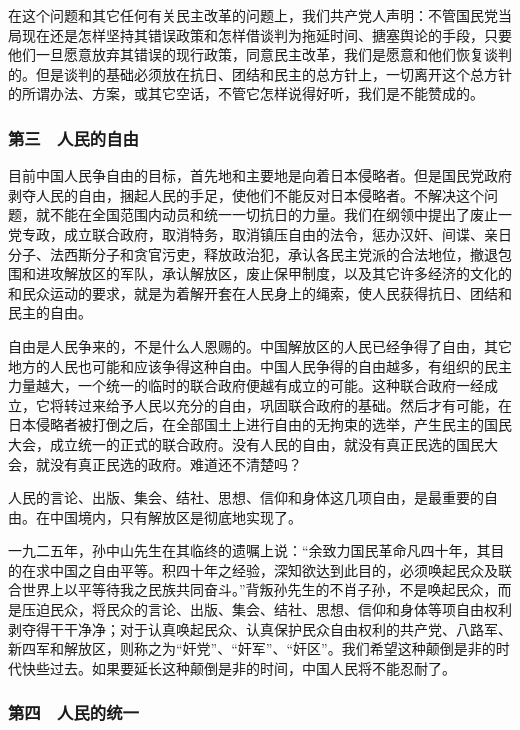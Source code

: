 在这个问题和其它任何有关民主改革的问题上，我们共产党人声明：不管国民党当局现在还是怎样坚持其错误政策和怎样借谈判为拖延时间、搪塞舆论的手段，只要他们一旦愿意放弃其错误的现行政策，同意民主改革，我们是愿意和他们恢复谈判的。但是谈判的基础必须放在抗日、团结和民主的总方针上，一切离开这个总方针的所谓办法、方案，或其它空话，不管它怎样说得好听，我们是不能赞成的。

\subsubsection{第三　人民的自由}

目前中国人民争自由的目标，首先地和主要地是向着日本侵略者。但是国民党政府剥夺人民的自由，捆起人民的手足，使他们不能反对日本侵略者。不解决这个问题，就不能在全国范围内动员和统一一切抗日的力量。我们在纲领中提出了废止一党专政，成立联合政府，取消特务，取消镇压自由的法令，惩办汉奸、间谍、亲日分子、法西斯分子和贪官污吏，释放政治犯，承认各民主党派的合法地位，撤退包围和进攻解放区的军队，承认解放区，废止保甲制度，以及其它许多经济的文化的和民众运动的要求，就是为着解开套在人民身上的绳索，使人民获得抗日、团结和民主的自由。

自由是人民争来的，不是什么人恩赐的。中国解放区的人民已经争得了自由，其它地方的人民也可能和应该争得这种自由。中国人民争得的自由越多，有组织的民主力量越大，一个统一的临时的联合政府便越有成立的可能。这种联合政府一经成立，它将转过来给予人民以充分的自由，巩固联合政府的基础。然后才有可能，在日本侵略者被打倒之后，在全部国土上进行自由的无拘束的选举，产生民主的国民大会，成立统一的正式的联合政府。没有人民的自由，就没有真正民选的国民大会，就没有真正民选的政府。难道还不清楚吗？

人民的言论、出版、集会、结社、思想、信仰和身体这几项自由，是最重要的自由。在中国境内，只有解放区是彻底地实现了。

一九二五年，孙中山先生在其临终的遗嘱上说：“余致力国民革命凡四十年，其目的在求中国之自由平等。积四十年之经验，深知欲达到此目的，必须唤起民众及联合世界上以平等待我之民族共同奋斗。”背叛孙先生的不肖子孙，不是唤起民众，而是压迫民众，将民众的言论、出版、集会、结社、思想、信仰和身体等项自由权利剥夺得干干净净；对于认真唤起民众、认真保护民众自由权利的共产党、八路军、新四军和解放区，则称之为“奸党”、“奸军”、“奸区”。我们希望这种颠倒是非的时代快些过去。如果要延长这种颠倒是非的时间，中国人民将不能忍耐了。

\subsubsection{第四　人民的统一}

